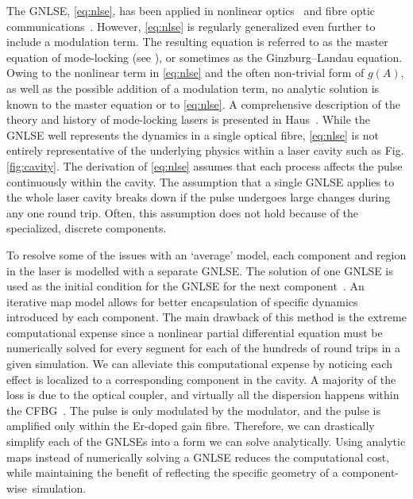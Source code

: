 \documentclass[9pt,twocolumn,twoside]{osajnl}
\begin{document}
The GNLSE, \eqref{eq:nlse}, has been applied in nonlinear optics~\cite{agrawal2013} and fibre optic communications~\cite{agrawal2002}. However, \eqref{eq:nlse} is regularly generalized even further to include a modulation term. The resulting equation is referred to as the master equation of mode-locking (see \cite{haus1975, haus1984, haus2000, tamura1996, usechak2005}), or sometimes as the Ginzburg--Landau equation. Owing to the nonlinear term in \eqref{eq:nlse} and the often non-trivial form of $g(A)$, as well as the possible addition of a modulation term, no analytic solution is known to the master equation or to \eqref{eq:nlse}. A comprehensive description of the theory and history of mode-locking lasers is presented in Haus~\cite{haus2000}. While the GNLSE well represents the dynamics in a single optical fibre, \eqref{eq:nlse} is not entirely representative of the underlying physics within a laser cavity such as Fig. \ref{fig:cavity}. The derivation of \eqref{eq:nlse} assumes that each process affects the pulse continuously within the cavity. The assumption that a single GNLSE applies to the whole laser cavity breaks down if the pulse undergoes large changes during any one round trip. Often, this assumption does not hold because of the specialized, discrete components.

To resolve some of the issues with an `average' model, each component and region in the laser is modelled with a separate GNLSE. The solution of one GNLSE is used as the initial condition for the GNLSE for the next component~\cite{lapre2019, meng2020, oktem2010, woodward2018}. An iterative map model allows for better encapsulation of specific dynamics introduced by each component. The main drawback of this method is the extreme computational expense since a nonlinear partial differential equation must be numerically solved for every segment for each of the hundreds of round trips in a given simulation. We can alleviate this computational expense by noticing each effect is localized to a corresponding component in the cavity. A majority of the loss is due to the optical coupler, and virtually all the dispersion happens within the CFBG~\cite{agrawal2002}. The pulse is only modulated by the modulator, and the pulse is amplified only within the Er-doped gain fibre. Therefore, we can drastically simplify each of the GNLSEs into a form we can solve analytically. Using analytic maps instead of numerically solving a GNLSE reduces the computational cost, while maintaining the benefit of reflecting the specific geometry of a component-wise~simulation.
\end{document}
